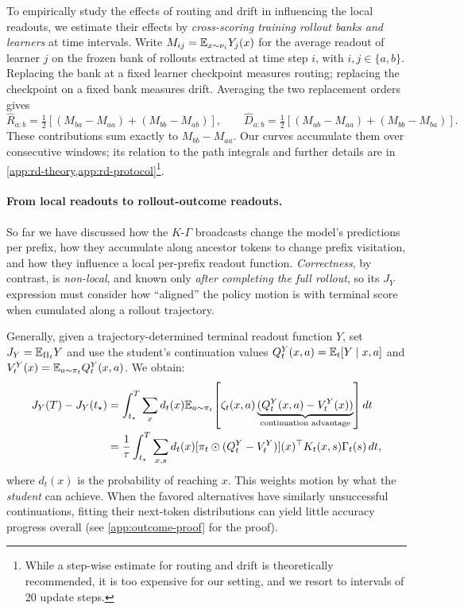To empirically study the effects of routing and drift in influencing the local readouts, we estimate their effects by \emph{cross-scoring training rollout banks and learners} at time intervals. Write $M_{ij}=\mathbb{E}_{x\sim\nu_i}Y_j(x)$ for the average readout of learner $j$ on the frozen bank of rollouts extracted at time step $i$, with $i,j\in\{a,b\}$. Replacing the bank at a fixed learner checkpoint measures routing; replacing the checkpoint on a fixed bank measures drift. Averaging the two replacement orders gives
\begin{equation}
 \widehat R_{a:b}=\tfrac12[(M_{ba}-M_{aa})+(M_{bb}-M_{ab})],\qquad
 \widehat D_{a:b}=\tfrac12[(M_{ab}-M_{aa})+(M_{bb}-M_{ba})].
 \label{eq:rd-estimators}
\end{equation}
These contributions sum exactly to $M_{bb}-M_{aa}$. Our curves accumulate them over consecutive windows; its relation to the path integrals and further details are in \cref{app:rd-theory,app:rd-protocol}\footnote{While a step-wise estimate for routing and drift is theoretically recommended, it is too expensive for our setting, and we resort to intervals of 20 update steps.}.

\paragraph{From local readouts to rollout-outcome readouts.}
So far we have discussed how the $K$-$\Gamma$ broadcasts change the model's predictions per prefix, how they accumulate along ancestor tokens to change prefix visitation, and how they influence a local per-prefix readout function. \emph{Correctness}, by contrast, is \emph{non-local}, and known only \emph{after completing the full rollout}, so its $J_Y$ expression must consider how ``aligned'' the policy motion is with terminal score when cumulated along a rollout trajectory. 

Generally, given a trajectory-determined terminal readout function $Y$, set $J_Y=\mathbb{E}_{\Pi_t}Y$ and use the student's continuation values
$Q_t^Y(x,a)=\mathbb{E}_t[Y\mid x,a]$ and $V_t^Y(x)=\mathbb{E}_{a\sim\pi_t}Q_t^Y(x,a)$.
We obtain:
\begin{equation}
 \begin{aligned}
 J_Y(T)-J_Y(t_\star)
 &=\int_{t_\star}^{T}\sum_xd_t(x)\mathbb{E}_{a\sim\pi_t}\!\left[\zeta_t(x,a)\underbrace{(Q_t^Y(x,a)-V_t^Y(x))}_{\text{continuation advantage}}\right]dt\\[-1pt]
 &=\frac1\tau\int_{t_\star}^{T}\sum_{x,s}d_t(x)
 [\pi_t\odot(Q_t^Y-V_t^Y)](x)^\top K_t(x,s)\Gamma_t(s)\,dt,
 \end{aligned}
 \label{eq:broadcast-continuations}
\end{equation}
where $d_t(x)$ is the probability of reaching $x$. This weights motion by what the \emph{student} can achieve. When the favored alternatives have similarly unsuccessful continuations, fitting their next-token distributions can yield little accuracy progress overall (see \cref{app:outcome-proof} for the proof).

